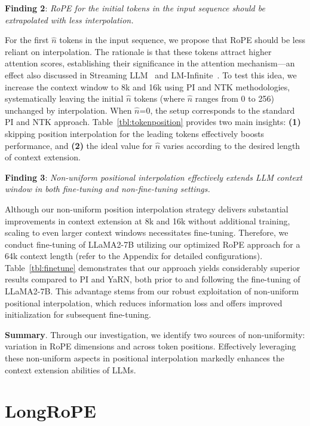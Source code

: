\textbf{Finding 2}: \textit{RoPE for the initial tokens in the input sequence should be extrapolated with less interpolation.} 

For the first $\hat{n}$ tokens in the input sequence, we propose that RoPE should be less reliant on interpolation. The rationale is that these tokens attract higher attention scores, establishing their significance in the attention mechanism—an effect also discussed in Streaming LLM~\cite{streamingllm} and LM-Infinite~\cite{han2023lminfinite}. To test this idea, we increase the context window to 8k and 16k using PI and NTK methodologies, systematically leaving the initial $\hat n$ tokens (where $\hat n$ ranges from 0 to 256) unchanged by interpolation. When $\hat n$=0, the setup corresponds to the standard PI and NTK approach. Table~\ref{tbl:tokenposition} provides two main insights: \textbf{(1)} skipping position interpolation for the leading tokens effectively boosts performance, and \textbf{(2)} the ideal value for $\hat n$ varies according to the desired length of context extension.

\textbf{Finding 3}: \textit{Non-uniform positional interpolation effectively extends LLM context window in both fine-tuning and non-fine-tuning settings.} 

Although our non-uniform position interpolation strategy delivers substantial improvements in context extension at 8k and 16k without additional training, scaling to even larger context windows necessitates fine-tuning. Therefore, we conduct fine-tuning of LLaMA2-7B utilizing our optimized RoPE approach for a 64k context length (refer to the Appendix for detailed configurations). Table~\ref{tbl:finetune} demonstrates that our approach yields considerably superior results compared to PI and YaRN, both prior to and following the fine-tuning of LLaMA2-7B. This advantage stems from our robust exploitation of non-uniform positional interpolation, which reduces information loss and offers improved initialization for subsequent fine-tuning.

\textbf{Summary}. Through our investigation, we identify two sources of non-uniformity: variation in RoPE dimensions and across token positions. Effectively leveraging these non-uniform aspects in positional interpolation markedly enhances the context extension abilities of LLMs.

\section{LongRoPE}

